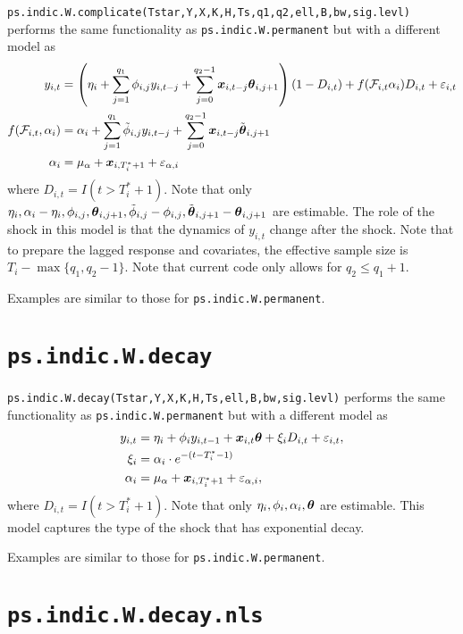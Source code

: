 \documentclass[12pt]{article}
\begin{document}
 \texttt{ps.indic.W.complicate(Tstar,Y,X,K,H,Ts,q1,q2,ell,B,bw,sig.levl)} performs the same functionality as  \texttt{ps.indic.W.permanent} but with a different model as 
 \begin{align*}
 	y_{i,t}
 	&= \left(\eta_i + \sum_{j=1}^{q_1} \phi_{i,j} y_{i, t-j} + \sum_{j=0}^{q_2-1} \boldsymbol{x}_{i, t-j}\boldsymbol{\theta}_{i, j + 1} \right) (1-D_{i,t}) + f(\mathcal{F}_{i, t} \alpha_i)D_{i,t} + \varepsilon_{i,t}  \\
 	f(\mathcal{F}_{i,t},\alpha_i)	 & = \alpha_i +\sum_{j=1}^{q_1} \tilde{\phi}_{i, j} y_{i, t-j} + \sum_{j=0}^{q_2-1} \boldsymbol{x}_{i, t-j} \tilde{\boldsymbol{\theta}}_{i, j +1} \\
 	\alpha_i & = \mu_{\alpha} + \boldsymbol{x}_{i, T_i^*+1} + \varepsilon_{\alpha, i}
 \end{align*}
 where $D_{i,t}=I(t > T_i^*+1)$. Note that only $\eta_i, \alpha_i - \eta_i, \phi_{i,j}, \boldsymbol{\theta}_{i, j+1}, \tilde{\phi}_{i,j}-\phi_{i,j}, \tilde{\boldsymbol{\theta}}_{i,j+1}-\boldsymbol{\theta}_{i, j+1}$ are estimable.
The role of the shock in this model is that the dynamics of $y_{i,t}$ change after the shock. Note that to prepare the lagged response and covariates, the effective sample size is $T_i-\max\{q_1, q_2-1\}$. Note that current code only allows for $q_2\leq q_1 + 1$.

Examples are similar to those for \texttt{ps.indic.W.permanent}.

\section{\texttt{ps.indic.W.decay}}
 
 \texttt{ps.indic.W.decay(Tstar,Y,X,K,H,Ts,ell,B,bw,sig.levl)} performs the same functionality as  \texttt{ps.indic.W.permanent} but with a different model as 
 \begin{align*}
 	y_{i,t} &= \eta_i + \phi_i y_{i, t-1}  + \boldsymbol{x}_{i, t}\boldsymbol{\theta} + \xi_i D_{i,t} + \varepsilon_{i,t},\\
 	\xi_i &= \alpha_i \cdot e^{-(t-T_i^*-1)} \\
 	\alpha_i & = \mu_{\alpha} + \boldsymbol{x}_{i, T_i^*+1} + \varepsilon_{\alpha, i},
 \end{align*}
 where $D_{i,t}=I(t > T_i^*+1)$. Note that only $\eta_i, \phi_i, \alpha_i, \boldsymbol{\theta}$ are estimable. This model captures the type of the shock that has exponential decay.
 
 Examples are similar to those for \texttt{ps.indic.W.permanent}.
 
 \section{\texttt{ps.indic.W.decay.nls}}
 
\end{document}
